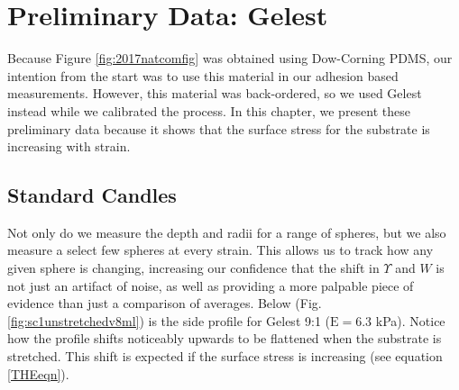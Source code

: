 \section{Preliminary Data: Gelest}
Because Figure \ref{fig:2017natcomfig} was obtained using Dow-Corning PDMS, our intention from the start was to use this material in our adhesion based measurements. However, this material was back-ordered, so we used Gelest instead while we calibrated the process. In this chapter, we present these preliminary data because it shows that the surface stress for the substrate is increasing with strain.  

\subsection{Standard Candles}
Not only do we measure the depth and radii for a range of spheres, but we also measure a select few spheres at every strain. This allows us to track how any given sphere is changing, increasing our confidence that the shift in $\Upsilon$ and $ W $ is not just an artifact of noise, as well as providing a more palpable piece of evidence than just a comparison of averages. Below (Fig. \ref{fig:sc1unstretchedv8ml}) is the side profile for Gelest 9:1 ($\text{E}=6.3$ kPa). Notice how the profile shifts noticeably upwards to be flattened when the substrate is stretched. This shift is expected if the surface stress is increasing (see equation \ref{THEeqn}).

